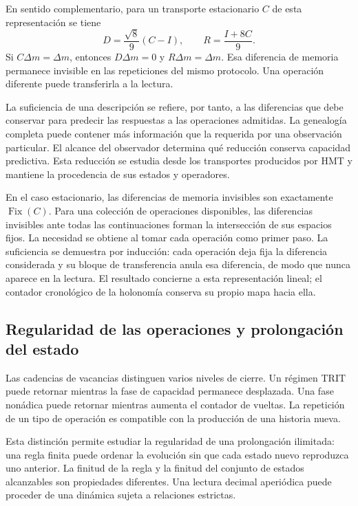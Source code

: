 En sentido complementario, para un transporte estacionario $C$ de
esta representación se tiene
\begin{equation}
 D=\frac{\sqrt8}{9}(C-I),\qquad R=\frac{I+8C}{9}.
 \label{md:lectin:bloques-memoria}
\end{equation}
Si $C\Delta m=\Delta m$, entonces $D\Delta m=0$ y
$R\Delta m=\Delta m$. Esa diferencia de memoria permanece invisible
en las repeticiones del mismo protocolo. Una operación diferente puede
transferirla a la lectura.

La suficiencia de una descripción se refiere, por tanto, a las
diferencias que debe conservar para predecir las respuestas a las
operaciones admitidas. La genealogía completa puede contener más
información que la requerida por una observación particular. El
alcance del observador determina qué reducción conserva capacidad
predictiva. Esta reducción se estudia desde los transportes producidos
por HMT y mantiene la procedencia de sus estados y operadores.

En el caso estacionario, las diferencias de memoria invisibles son
exactamente $\operatorname{Fix}(C)$. Para una colección de operaciones
disponibles, las diferencias invisibles ante todas las continuaciones
forman la intersección de sus espacios fijos. La necesidad se obtiene
al tomar cada operación como primer paso. La suficiencia se demuestra
por inducción: cada operación deja fija la diferencia considerada y
su bloque de transferencia anula esa diferencia, de modo que nunca
aparece en la lectura. El resultado concierne a esta representación
lineal; el contador cronológico de la holonomía conserva su propio mapa
hacia ella.

\subsection{Regularidad de las operaciones y prolongación del estado}
\label{md:lectin:regularidad}

Las cadencias de vacancias distinguen varios niveles de cierre. Un
régimen TRIT puede retornar mientras la fase de capacidad permanece
desplazada. Una fase nonádica puede retornar mientras aumenta el
contador de vueltas. La repetición de un tipo de operación es
compatible con la producción de una historia nueva.

Esta distinción permite estudiar la regularidad de una prolongación
ilimitada: una regla finita puede ordenar la evolución sin que cada
estado nuevo reproduzca uno anterior. La finitud de la regla y la
finitud del conjunto de estados alcanzables son propiedades diferentes.
Una lectura decimal aperiódica puede proceder de una dinámica sujeta
a relaciones estrictas.

